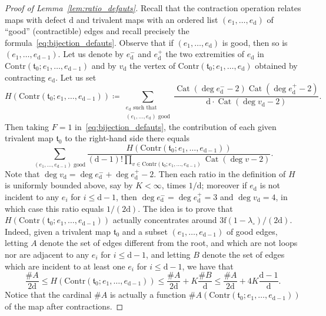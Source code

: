 \documentclass[JEP,XML,SOM,Unicode,NoFloatCountersInSection,NoEqCountersInSection]{cedram}
\DeclareMathOperator{\Cat}{Cat}
\theoremstyle{plain}
\theoremstyle{definition}
\theoremstyle{remark}
\newcommand{\face}{\mathrm{f}}
\newcommand{\defect}{\mathrm{d}}
\begin{document}
\begin{proof}[Proof of Lemma~\ref{lem:ratio_defauts}]
Recall that the contraction operation relates maps with defect $\defect$ and trivalent maps with an ordered list $(e_1, \dots, e_\defect)$ of ``good'' (\ie contractible) edges and recall precisely the formula~\eqref{eq:bijection_defauts}.
Observe that if $(e_1, \dots, e_\defect)$ is good, then so is $(e_1, \dots, e_{\defect-1})$. Let us denote by $e_\defect^-$ and $e_\defect^+$ the two extremities of $e_\defect$ in $\mathrm{Contr}(\mathfrak{t}_0 ; e_1, \dots, e_{\defect-1})$ and by $v_\defect$ the vertex of $\mathrm{Contr}(\mathfrak{t}_0 ; e_1, \dots, e_\defect)$ obtained by contracting $e_\defect$.
Let us set
\[
H(\mathrm{Contr}(\mathfrak{t}_0 ; e_1, \dots, e_{ \defect-1}))
\coloneqq \sum_{\substack{e_\defect \text{ such that}\\ (e_1, \dots, e_\defect) \text{ good}}} \frac{\Cat(\deg e_\defect^- - 2) \Cat(\deg e_\defect^+ - 2)}{\defect\cdot\Cat(\deg v_\defect - 2)}.
\]
Then taking $F=1$ in~\eqref{eq:bijection_defauts}, the contribution of each given trivalent map $\mathfrak{t}_0$ to the right-hand side there equals
\[
\sum_{(e_1, \dots, e_{\defect-1}) \text{ good}} \frac{H(\mathrm{Contr}(\mathfrak{t}_0 ; e_1, \dots, e_{ \defect-1}))}{(\defect-1)! \prod_{v \in \mathrm{Contr}(\mathfrak{t}_0 ; e_1, \dots, e_{\defect-1})} \Cat(\deg v - 2)}.
\]
Note that $\deg v_\defect = \deg e_\defect^- + \deg e_\defect^+ - 2$. Then each ratio in the definition of $H$ is uniformly bounded above, say by $K < \infty$, times $1/\defect$; moreover if $e_\defect$ is not incident to any $e_i$ for $i \le \defect-1$, then $\deg e_\defect^- = \deg e_\defect^+ = 3$ and $\deg v_\defect = 4$, in which case this ratio equals $1/(2\defect)$. The idea is to prove that $H(\mathrm{Contr}(\mathfrak{t}_0 ; e_1, \dots, e_{ \defect-1}))$ actually concentrates around $3\face(1-\lambda_\circ) / (2\defect)$. Indeed, given a trivalent map $\mathfrak{t}_0$ and a subset $(e_1, \dots, e_{\defect-1})$ of good edges, letting $A$ denote the set of edges different from the root, and which are not loops nor are adjacent to any $e_i$ for $i \le \defect-1$, and letting $B$ denote the set of edges which are incident to at least one $e_i$ for $i \le \defect-1$,
we have that
\[
\frac{\# A}{2\defect}
\le H(\mathrm{Contr}(\mathfrak{t}_0 ; e_1, \dots, e_{ \defect-1}))
\le \frac{\# A}{2\defect} + K \frac{\# B}{\defect}
\le \frac{\# A}{2\defect} + 4 K \frac{\defect-1}{\defect}.
\]
Notice that the cardinal $\#A$ is actually a function $\#A(\mathrm{Contr}(\mathfrak{t}_0 ; e_1, \dots, e_{ \defect-1}))$ of the map after contractions.

\end{proof}
\end{document}
